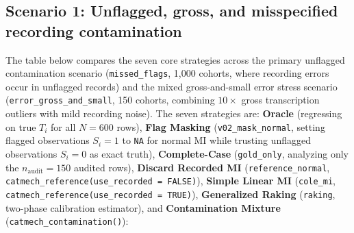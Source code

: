\documentclass[
]{article}
\begin{document}
\subsection{Scenario 1: Unflagged, gross, and misspecified recording
contamination}\label{scenario-1-unflagged-gross-and-misspecified-recording-contamination}

The table below compares the seven core strategies across the primary
unflagged contamination scenario (\texttt{missed\_flags}, 1,000 cohorts,
where recording errors occur in unflagged records) and the mixed
gross-and-small error stress scenario
(\texttt{error\_gross\_and\_small}, 150 cohorts, combining \(10\times\)
gross transcription outliers with mild recording noise). The seven
strategies are: \textbf{Oracle} (regressing on true \(T_i\) for all
\(N = 600\) rows), \textbf{Flag Masking} (\texttt{v02\_mask\_normal},
setting flagged observations \(S_i = 1\) to \texttt{NA} for normal MI
while trusting unflagged observations \(S_i = 0\) as exact truth),
\textbf{Complete-Case} (\texttt{gold\_only}, analyzing only the
\(n_{\text{audit}} = 150\) audited rows), \textbf{Discard Recorded MI}
(\texttt{reference\_normal},
\texttt{catmech\_reference(use\_recorded\ =\ FALSE)}), \textbf{Simple
Linear MI} (\texttt{cole\_mi},
\texttt{catmech\_reference(use\_recorded\ =\ TRUE)}),
\textbf{Generalized Raking} (\texttt{raking}, two-phase calibration
estimator), and \textbf{Contamination Mixture}
(\texttt{catmech\_contamination()}):
\end{document}
